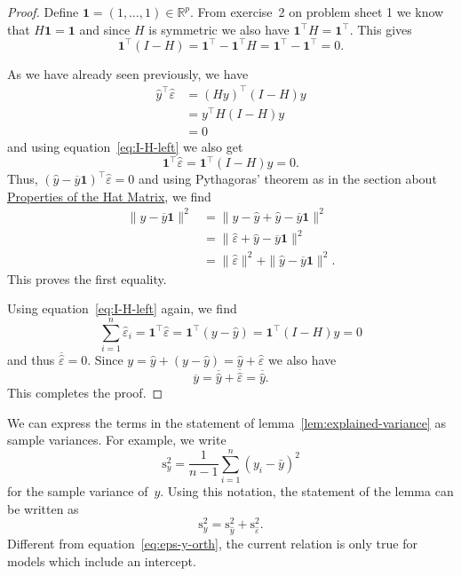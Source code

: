 \documentclass[
  a4paper,
]{article}
\theoremstyle{definition}
\theoremstyle{definition}
\theoremstyle{definition}
\theoremstyle{definition}
\theoremstyle{remark}
\begin{document}
\begin{proof}
Define \(\mathbf{1} = (1, \ldots, 1) \in \mathbb{R}^p\). From exercise~2 on
problem sheet 1 we know that \(H\mathbf{1} = \mathbf{1}\) and since \(H\)
is symmetric we also have \(\mathbf{1}^\top H = \mathbf{1}^\top\).
This gives
\begin{equation}
  \mathbf{1}^\top (I - H)
  = \mathbf{1}^\top - \mathbf{1}^\top H
  = \mathbf{1}^\top - \mathbf{1}^\top
  = 0.  \label{eq:I-H-left}
\end{equation}

As we have already seen previously, we have
\begin{align*}
  \hat y^\top \hat\varepsilon
  &= (H y)^\top (I - H) y \\
  &= y^\top H (I - H) y \\
  &= 0
\end{align*}
and using equation~\eqref{eq:I-H-left} we also get
\begin{equation}
  \mathbf{1}^\top \hat\varepsilon
  = \mathbf{1}^\top (I - H) y
  = 0.
\end{equation}
Thus, \((\hat y - \overline{y} \mathbf{1})^\top \hat\varepsilon= 0\) and using
Pythagoras' theorem as in the section about \protect\hyperlink{hat-matrix}{Properties of the Hat Matrix}, we
find
\begin{align*}
  \| y - \overline{y} \mathbf{1} \|^2
  &= \| y - \hat y + \hat y - \overline{y} \mathbf{1} \|^2 \\
  &= \| \hat \varepsilon+ \hat y - \overline{y} \mathbf{1} \|^2 \\
  &= \| \hat \varepsilon\|^2 + \| \hat y - \overline{y} \mathbf{1} \|^2.
\end{align*}
This proves the first equality.

Using equation~\eqref{eq:I-H-left} again, we find
\begin{equation*}
  \sum_{i=1}^n \hat\varepsilon_i
  = \mathbf{1}^\top \hat\varepsilon
  = \mathbf{1}^\top (y - \hat y)
  = \mathbf{1}^\top (I - H) y
  = 0
\end{equation*}
and thus \(\overline{\hat\varepsilon} = 0\).
Since \(y = \hat y + (y - \hat y) = \hat y + \hat\varepsilon\) we also have
\begin{equation*}
  \overline{y}
  = \overline{\hat y} + \overline{\hat\varepsilon}
  = \overline{\hat y}.
\end{equation*}
This completes the proof.
\end{proof}

We can express the terms in the statement of lemma~\ref{lem:explained-variance}
as sample variances. For example, we write
\begin{equation*}
  \mathrm{s}_y^2
  = \frac{1}{n-1} \sum_{i=1}^n (y_i - \bar y)^2
\end{equation*}
for the sample variance of~\(y\). Using this notation, the statement of
the lemma can be written as
\begin{equation*}
  \mathrm{s}_y^2
  = \mathrm{s}_{\hat y}^2 + \mathrm{s}_{\hat\varepsilon}^2.
\end{equation*}
Different from equation~\eqref{eq:eps-y-orth}, the current relation is
only true for models which include an intercept.
\end{document}
